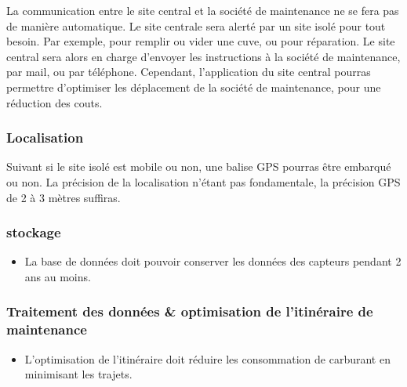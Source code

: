             La communication entre le site central et la société de maintenance ne se fera pas de manière automatique.
            Le site centrale sera alerté par un site isolé pour tout besoin. Par exemple, pour remplir ou vider une cuve, ou pour réparation.
            Le site central sera alors en charge d'envoyer les instructions à la société de maintenance, par mail, ou par téléphone.
            Cependant, l'application du site central pourras permettre d'optimiser les déplacement de la société de maintenance, pour une réduction des couts.
            
        \subsubsection{Localisation}
        
            Suivant si le site isolé est mobile ou non, une balise GPS pourras être embarqué ou non.
            La précision de la localisation n'étant pas fondamentale, la précision GPS de 2 à 3 mètres suffiras.
            
        \subsubsection{stockage}
        
            \begin{itemize}
                \item La base de données doit pouvoir conserver les données des capteurs pendant 2 ans au moins.
            \end{itemize}
            
        \subsubsection{Traitement des données \& optimisation de l'itinéraire de maintenance}
        
            \begin{itemize}
                \item L'optimisation de l'itinéraire doit réduire les consommation de carburant en minimisant les trajets.
            \end{itemize}

